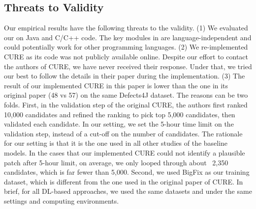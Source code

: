 \subsection{Threats to Validity}



Our empirical results have the following threats to the validity. (1)
We evaluated our {\tool} on Java and C/C++ code.  The key modules in
{\tool} are language-independent and could potentially work for other programming
languages.  (2) We re-implemented CURE as its code was not publicly
available online. Despite our effort to contact the authors of CURE,
we have never received their response. Under that, we tried our best
to follow the details in their paper during the implementation. (3)
The result of our implemented CURE in this paper is lower than the one
in its original paper (48 vs 57) on the same Defects4J dataset. The
reasons can be two folds. First, in the validation step of the
original CURE, the authors first ranked 10,000 candidates and refined
the ranking to pick top 5,000 candidates, then validated each
candidate. In our setting, we set the 5-hour time limit on the
validation step, instead of a cut-off on the number of candidates. The
rationale for our setting is that it is the one used in all other
studies of the baseline models. In the cases that our implemented CURE
could not identify a plausible patch after 5-hour limit, on average,
we only looped through about ~2,350 candidates, which is far fewer
than 5,000. Second, we used BigFix as our training dataset, which is
different from the one used in the original paper of CURE. In brief,
for all DL-based approaches, we used the same datasets and under the
same settings and computing environments.





